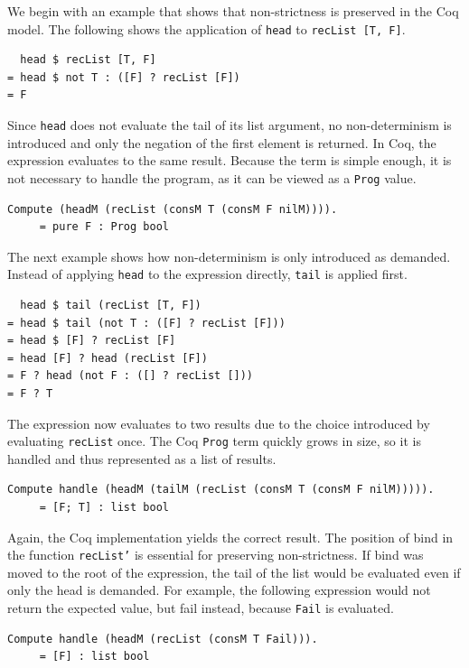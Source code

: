 \documentclass[a4paper, 11pt, fleqn, twoside]{scrreprt}
\newcommand{\hinl}[1]{\texttt{#1}}
\newcommand{\cinl}[1]{\texttt{#1}}
\begin{document}
We begin with an example that shows that non-strictness is preserved in the Coq model.
The following shows the application of \cinl{head} to \cinl{recList [T, F]}.

\begin{verbatim}
  head $ recList [T, F]
= head $ not T : ([F] ? recList [F])
= F
\end{verbatim}

Since \hinl{head} does not evaluate the tail of its list argument, no non-determinism is introduced and only the negation of the first element is returned.
In Coq, the expression evaluates to the same result.
Because the term is simple enough, it is not necessary to handle the program, as it can be viewed as a \cinl{Prog} value.

\begin{verbatim}
Compute (headM (recList (consM T (consM F nilM)))).
     = pure F : Prog bool
\end{verbatim}

The next example shows how non-determinism is only introduced as demanded.
Instead of applying \hinl{head} to the expression directly, \hinl{tail} is applied first.

\begin{verbatim}
  head $ tail (recList [T, F])
= head $ tail (not T : ([F] ? recList [F]))
= head $ [F] ? recList [F]
= head [F] ? head (recList [F])
= F ? head (not F : ([] ? recList []))
= F ? T
\end{verbatim}

The expression now evaluates to two results due to the choice introduced by evaluating \hinl{recList} once.
The Coq \cinl{Prog} term quickly grows in size, so it is handled and thus represented as a list of results.

\begin{verbatim}
Compute handle (headM (tailM (recList (consM T (consM F nilM))))).
     = [F; T] : list bool
\end{verbatim}

Again, the Coq implementation yields the correct result.
The position of bind in the function \cinl{recList'} is essential for preserving non-strictness.
If bind was moved to the root of the expression, the tail of the list would be evaluated even if only the head is demanded.
For example, the following expression would not return the expected value, but fail instead, because \cinl{Fail} is evaluated.

\begin{verbatim}
Compute handle (headM (recList (consM T Fail))).
     = [F] : list bool
\end{verbatim}
\end{document}

